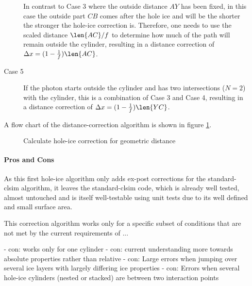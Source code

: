 \begin{description}
  In contrast to Case 3 where the outside distance $AY$ has been fixed, in this case the outside part $CB$ comes after the hole ice and will be the shorter the stronger the hole-ice correction is. Therefore, one needs to use the scaled distance $\len{AC} / f$ to determine how much of the path will remain outside the cylinder, resulting in a distance correction of $\Delta x = (1 - \frac{1}{f})\len{AC}$.
  \item[Case 5] If the photon starts outside the cylinder and has two intersections ($N = 2$) with the cylinder, this is a combination of Case 3 and Case 4, resulting in a distance correction of $\Delta x = (1 - \frac{1}{f})\len{YC}$.
\end{description}

A flow chart of the distance-correction algorithm is shown in figure \ref{fig:Eeshi4Oh}.

\begin{figure}[htbp]
  \caption{Calculate hole-ice correction for geometric distance}
  \label{fig:Eeshi4Oh}
\end{figure}

\paragraph{Pros and Cons}
As this first hole-ice algorithm only adds ex-post corrections for the standard-clsim algorithm, it leaves the standard-clsim code, which is already well tested, almost untouched and is itself well-testable using unit tests due to its well defined and small surface area.

This correction algorithm works only for a specific subset of conditions that are not met by the current requirements of ...

- con: works only for one cylinder
- con: current understanding more towards absolute properties rather than relative
- con: Large errors when jumping over several ice layers with largely differing ice properties
- con: Errors when several hole-ice cylinders (nested or stacked) are between two interaction points

